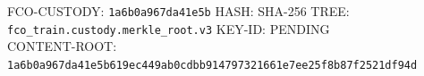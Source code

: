 \vspace*{-0.4em}
{\scriptsize\noindent FCO-CUSTODY: \texttt{1a6b0a967da41e5b} \quad HASH: SHA-256 \quad TREE: \texttt{fco\_train.custody.merkle\_root.v3} \quad KEY-ID: PENDING\\
CONTENT-ROOT: \texttt{1a6b0a967da41e5b619ec449ab0cdbb9\allowbreak 14797321661e7ee25f8b87f2521df94d}}
\vspace{0.4em}
